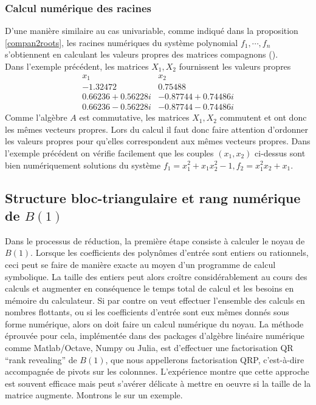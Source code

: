 \documentclass{standalone}
\begin{document}
  \subsubsection{Calcul numérique des racines}
  D'une manière similaire au cas univariable, comme indiqué dans la proposition \ref{compan2roots}, les racines numériques du système polynomial $f_1, \cdots, f_n$ s'obtiennent en calculant les valeurs propres des matrices compagnons (\cite{AS}).\\
  Dans l'exemple précédent, les matrices $X_1, X_2$ fournissent les valeurs propres
  $$
  \begin{array}{c|c}
  	x_1 & x_2 \\
  	\hline
  	-1.32472  & 0.75488 \\
  	0.66236 + 0.56228i & -0.87744 + 0.74486i \\
  	0.66236 - 0.56228i & -0.87744 - 0.74486i
  \end{array}
  $$
  Comme l'algèbre $A$ est commutative, les matrices $X_1, X_2$ commutent et ont donc les mêmes vecteurs propres. Lors du calcul il faut donc faire attention d'ordonner les valeurs propres pour qu'elles correspondent aux mêmes vecteurs propres.
  Dans l'exemple précédent on vérifie facilement que les couples $(x_1, x_2)$ ci-dessus sont bien numériquement solutions du système $f_1 = x_1^2 + x_1x_2^2 - 1, f_2 = x_1^2x_2 + x_1$.

  \subsection{Structure bloc-triangulaire et rang numérique de $B(1)$}
  Dans le processus de réduction, la première étape consiste à calculer le noyau de $B(1)$. Lorsque les coefficients des polynômes d'entrée sont entiers ou rationnels, ceci peut se faire de manière exacte au moyen d'un programme de calcul symbolique. La taille des entiers peut alors croître considérablement au cours des calculs et augmenter en conséquence le temps total de calcul et les besoins en mémoire du calculateur. Si par contre on veut effectuer l'ensemble des calculs en nombres flottants, ou si les coefficients d'entrée sont eux mêmes donnés sous forme numérique, alors on doit faire un calcul numérique du noyau.
  La méthode éprouvée pour cela, implémentée dans des packages d'algèbre linéaire numérique comme Matlab/Octave, Numpy ou Julia, est d'effectuer une factorisation QR ``rank revealing'' de $B(1)$, que nous appellerons factorisation QRP, c'est-à-dire accompagnée de pivots sur les colonnnes. L'expérience montre que cette approche est souvent efficace mais peut s'avérer délicate à mettre en oeuvre si la taille de la matrice augmente. Montrons le sur un exemple.
\end{document}
